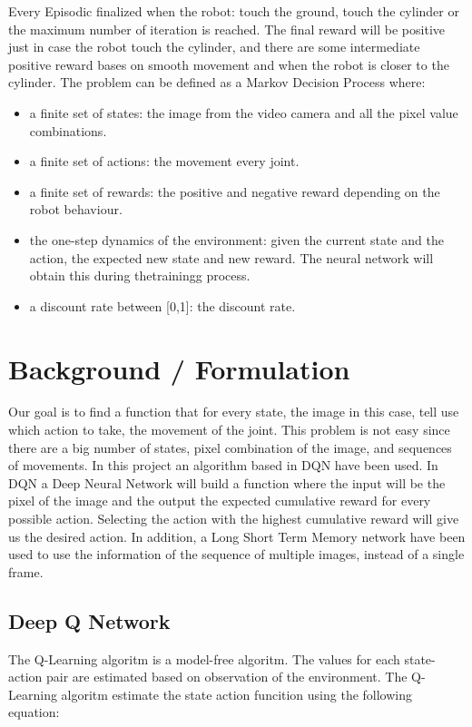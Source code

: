 \documentclass[10pt,journal,compsoc]{IEEEtran}
\begin{document}
Every Episodic finalized when the robot: touch the ground, touch the cylinder or the maximum number of iteration is reached. The final reward will be positive just in case the robot touch the cylinder, and there are some intermediate positive reward bases on smooth movement and when the robot is closer to the cylinder. The problem can be defined as a Markov Decision Process where:
\begin{itemize}
\item a finite set of states: the image from the video camera and all the pixel value combinations.
\item a finite set of actions: the movement every joint.
\item a finite set of rewards: the positive and negative reward depending on the robot behaviour.
\item the one-step dynamics of the environment: given the current state and the action, the expected new state and new reward. The neural network will obtain this during thetrainingg process.
\item a discount rate between [0,1]: the discount rate.
\end{itemize}

\label{sec:introduction}

\section{Background / Formulation}

Our goal is to find a function that for every state, the image in this case, tell use which action to take, the movement of the joint. This problem is not easy since there are a big number of states, pixel combination of the image, and sequences of movements. In this project an algorithm based in DQN have been used. In DQN a Deep Neural Network will build a function where the input will be the pixel of the image and the output the expected cumulative reward for every possible action. Selecting the action with the highest cumulative reward will give us the desired action. In addition, a Long Short Term Memory network have been used to use the information of the sequence of multiple images, instead of a single frame.

\subsection{Deep Q Network}

The Q-Learning algoritm is a model-free algoritm. The values for each state-action pair are estimated based on observation of the environment. The Q-Learning algoritm estimate the state action funcition using the following equation:
\end{document}
